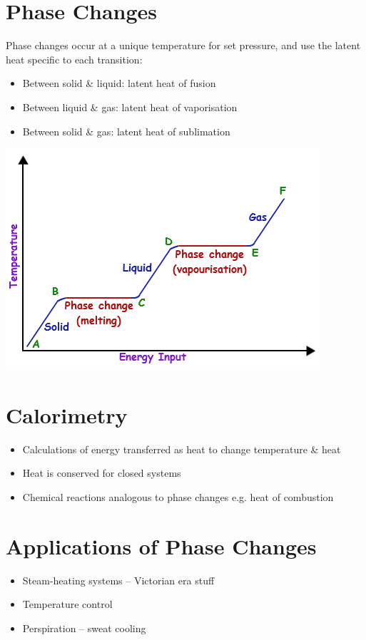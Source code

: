 \documentclass[a4paper, 11pt, fleqn, normalem]{report}
\begin{document}
\section{Phase Changes}
Phase changes occur at a unique temperature for set pressure, and use the latent heat specific to each transition:
\begin{itemize}
    \item[] Between solid \& liquid: latent heat of fusion
    \item[] Between liquid \& gas: latent heat of vaporisation
    \item[] Between solid \& gas: latent heat of sublimation
\end{itemize}
\includegraphics[scale=0.65]{download.png}

\section{Calorimetry}
\begin{itemize}
    \item Calculations of energy transferred as heat to change temperature \& heat
    \item Heat is conserved for closed systems
    \item Chemical reactions analogous to phase changes e.g. heat of combustion
\end{itemize}

\section{Applications of Phase Changes}
\begin{itemize}
    \item Steam-heating systems -- Victorian era stuff
    \item Temperature control
    \item Perspiration -- sweat cooling
\end{itemize}
\end{document}
